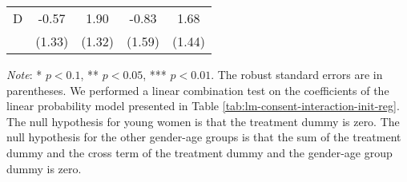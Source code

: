 \documentclass[12pt, a4paper]{article}
\begin{document}
\begin{table}[H]
\begin{threeparttable}
\begin{tabular}[t]{lcccc}
\hspace{1em}D & -0.57 & 1.90 & -0.83 & 1.68\\
\hspace{1em} & (1.33) & (1.32) & (1.59) & (1.44)\\
\bottomrule
\end{tabular}
\begin{tablenotes}
\item \emph{Note}: * $p < 0.1$, ** $p < 0.05$, *** $p < 0.01$. The robust standard errors are in parentheses. We performed a linear combination test on the coefficients of the linear probability model presented in Table \ref{tab:lm-consent-interaction-init-reg}. The null hypothesis for young women is that the treatment dummy is zero. The null hypothesis for the other gender-age groups is that the sum of the treatment dummy and the cross term of the treatment dummy and the gender-age group dummy is zero.
\end{tablenotes}
\end{threeparttable}
\end{table}
\end{document}

